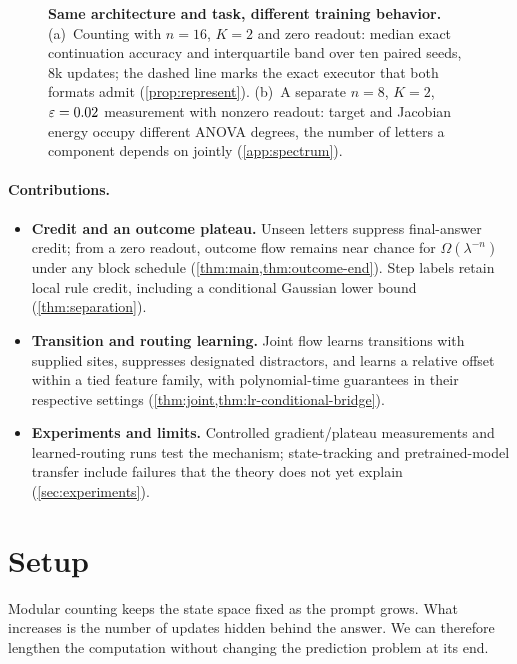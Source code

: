 \begin{figure}[t]
\centering

\caption{\textbf{Same architecture and task, different training behavior.}
(a)~Counting with $n=16$, $K=2$ and zero readout: median exact continuation accuracy and interquartile band over ten paired seeds, $8$k
updates; the dashed line marks the exact executor that both formats admit (\cref{prop:represent}).
(b)~A separate $n=8$, $K=2$, $\varepsilon=0.02$ measurement with nonzero readout: target and Jacobian energy occupy different ANOVA degrees, the number of letters a component depends on jointly (\cref{app:spectrum}).}
\label{fig:overview}
\end{figure}

\paragraph{Contributions.}
\begin{itemize}[leftmargin=*,itemsep=2pt,topsep=2pt]
\item \textbf{Credit and an outcome plateau.} Unseen letters suppress final-answer credit;
from a zero readout, outcome flow remains near chance for $\Omega(\lambda^{-n})$
under any block schedule (\cref{thm:main,thm:outcome-end}). Step labels retain local rule
credit, including a conditional Gaussian lower bound (\cref{thm:separation}).
\item \textbf{Transition and routing learning.} Joint flow learns transitions with supplied
sites, suppresses designated distractors, and learns a relative offset within a tied
feature family, with polynomial-time guarantees in their respective settings
(\cref{thm:joint,thm:lr-conditional-bridge}).
\item \textbf{Experiments and limits.} Controlled gradient/plateau measurements and learned-routing
runs test the mechanism; state-tracking and pretrained-model transfer include failures
that the theory does not yet explain (\cref{sec:experiments}).
\end{itemize}

\section{Setup}
\label{sec:setup}
\label{sec:setting}

Modular counting keeps the state space fixed as the prompt grows. What increases is the number of updates hidden behind the
answer. We can therefore lengthen the computation without changing the prediction problem at its end.

